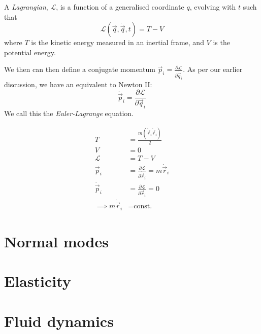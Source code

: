 \documentclass[a4paper]{article}
\begin{document}
\begin{defi}[Lagrangian]
  A \emph{Lagrangian}, $\mathcal{L}$, is a function of a generalised coordinate $q$, evolving with $t$ such that
  $$\mathcal{L}(\vec{q}, \dot{\vec{q}}, t) = T - V$$
  where $T$ is the kinetic energy measured in an inertial frame, and $V$ is the potential energy.
\end{defi}

We then can then define a conjugate momentum $\vec{p}_i = \frac{\partial\mathcal{L}}{\partial\dot{\vec{q}}_i}$. As per our earlier discussion, we have an equivalent to Newton II:
$$\dot{\vec{p}}_i = \frac{\partial\mathcal{L}}{\partial\vec{q}_i}$$
We call this the \emph{Euler-Lagrange} equation.

\begin{eg}
  \begin{align*}
    T &= \frac{m(\dot{\vec{r}}_i\dot{\vec{r}}_i)}{2} \\
    V &= 0 \\
    \mathcal{L} &= T - V \\
    \vec{p}_i &= \frac{\partial \mathcal{L}}{\partial \dot{\vec{r}}_i} = m \dot{\vec{r}}_i \\
    \dot{\vec{p}}_i &= \frac{\partial \mathcal{L}}{\partial \vec{r}_i} = 0 \\
    \implies m \dot{\vec{r}}_i &= \textrm{const.}
  \end{align*}
\end{eg}

\section{Normal modes}\label{sec:normal-modes}
\section{Elasticity}\label{sec:elasticity}
\section{Fluid dynamics}\label{sec:fluid-dynamics}
\end{document}
